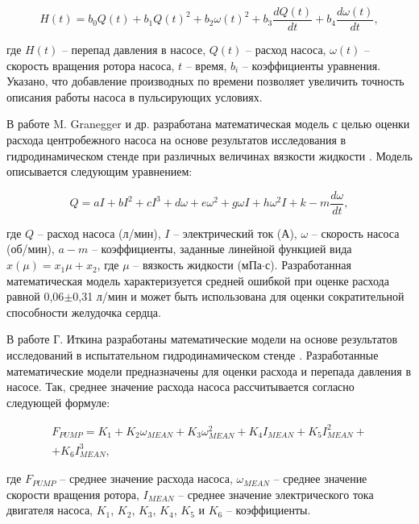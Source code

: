 \begin{equation}
	H(t) = b_0Q(t) + b_1Q(t)^2 + b_2\omega(t)^2 + b_3\frac{dQ(t)}{dt} + b_4\frac{d\omega(t)}{dt},
	\label{eq:pirbodaghi_equation}
\end{equation}

\noindent где $H(t)$ -- перепад давления в насосе, $Q(t)$ -- расход насоса, $\omega(t)$ -- скорость вращения ротора насоса, $t$ -- время, $b_i$ -- коэффициенты уравнения. Указано, что добавление производных по времени позволяет увеличить точность описания работы насоса в пульсирующих условиях. 

В работе M. Granegger и др. разработана математическая модель с целью оценки расхода центробежного насоса на основе результатов исследования в гидродинамическом стенде при различных величинах вязкости жидкости \cite{Granegger_2012}. Модель описывается следующим уравнением:

\begin{equation}
	Q = aI + bI^2 + cI^3 + d\omega + e\omega^2 + g\omega I + h\omega^2 I + k - m\frac{d\omega}{dt},
	\label{eq:granegger_equation}
\end{equation}

\noindent где $Q$ -- расход насоса (л/мин), $I$ -- электрический ток (А), $\omega$ -- скорость насоса (об/мин), $a-m$ -- коэффициенты, заданные линейной функцией вида $x(\mu) = x_1\mu + x_2$, где $\mu$ -- вязкость жидкости (мПа$\cdot$с). Разработанная математическая модель характеризуется средней ошибкой при оценке расхода равной 0,06$\pm$0,31 л/мин и может быть использована для оценки сократительной способности желудочка сердца. 

В работе Г. Иткина разработаны математические модели на основе результатов исследований в испытательном гидродинамическом стенде \cite{vest_2015}. Разработанные математические модели предназначены для оценки расхода и перепада давления в насосе. Так, среднее значение расхода насоса рассчитывается согласно следующей формуле:

\begin{eqnarray}
	F_{PUMP} = K_1 + K_2\omega_{MEAN} + K_3\omega_{MEAN}^2 + K_4I_{MEAN} + K_5I_{MEAN}^2 + \nonumber \\ + K_6I_{MEAN}^3,
	\label{eq:itkin_equation}
\end{eqnarray}

\noindent где $F_{PUMP}$ -- среднее значение расхода насоса, $\omega_{MEAN}$ -- среднее значение скорости вращения ротора, $I_{MEAN}$ -- среднее значение электрического тока двигателя насоса, $K_1$, $K_2$, $K_3$, $K_4$, $K_5$ и $K_6$ -- коэффициенты. 

